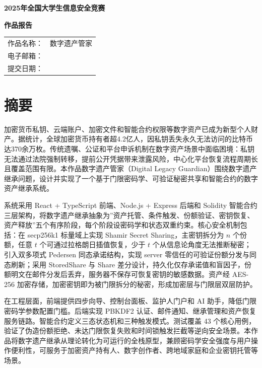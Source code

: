 \documentclass[UTF8,a4paper,zihao=-4,openany]{ctexrep}
\newcommand{\project}{数字遗产管家}
\newcommand{\englishname}{Digital Legacy Guardian}
\begin{document}
\songti

\begin{titlepage}
\centering
\vspace*{2.2cm}
{\bfseries 2025年全国大学生信息安全竞赛\par}
\vspace{1.2cm}
{\bfseries 作品报告\par}
\vspace{2.4cm}
\begin{tabular}{rl}
作品名称：& \project\\[0.8cm]
电子邮箱：& \underline{\hspace{8cm}}\\[0.8cm]
提交日期：& \underline{\hspace{8cm}}\\
\end{tabular}
\vfill
\end{titlepage}

\chapter*{摘要}

加密货币私钥、云端账户、加密文件和智能合约权限等数字资产已成为新型个人财产。据统计，全球加密货币持有者超4.2亿人，因私钥丢失永久无法访问的比特币达370余万枚。传统遗嘱、公证和平台申诉机制在数字资产场景中面临困境：私钥无法通过法院强制转移，提前公开凭据带来泄露风险，中心化平台恢复流程周期长且覆盖范围有限。本作品\project（\englishname）围绕数字遗产继承问题，设计并实现了一个基于门限密码学、可验证秘密共享和智能合约的数字资产继承系统。

系统采用 React + TypeScript 前端、Node.js + Express 后端和 Solidity 智能合约三层架构，将数字遗产继承抽象为”资产托管、条件触发、份额验证、密钥恢复、资产释放”五个有序阶段，每个阶段设密码学和状态双重约束。核心安全机制包括：在 secp256k1 标量域上实现 Shamir Secret Sharing，主密钥拆分为 $n$ 个份额，任意 $t$ 个可通过拉格朗日插值恢复，少于 $t$ 个从信息论角度无法推断秘密；引入双多项式 Pedersen 同态承诺结构，实现 server 零信任的可验证份额分发与同态刷新；采用 StoredShare 与 Share 差分设计，持久化仅存承诺值和盲因子，份额明文在邮件分发后丢弃，服务器不保存可恢复密钥的敏感数据。资产经 AES-256 加密存储，加密密钥即为被门限拆分的秘密，形成加密层与门限层双层防护。

在工程层面，前端提供四步向导、控制台面板、监护人门户和 AI 助手，降低门限密码学参数配置门槛。后端实现 PBKDF2 认证、邮件通知、继承管理和资产恢复服务链路。智能合约定义三态状态机和三种触发模式。测试覆盖 43 个核心用例，验证了伪造份额拒绝、未达门限恢复失败和时间锁触发拦截等逆向安全场景。本作品将数字遗产继承从理论转化为可运行的全栈原型，兼顾密码学安全强度与用户操作便利性，可服务于加密资产持有人、数字创作者、跨地域家庭和企业密钥托管等场景。
\end{document}
